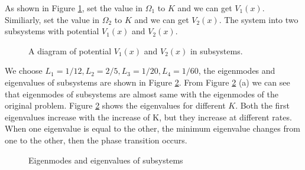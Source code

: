 \documentclass[12pt,a4paper]{article}
\begin{document}
As shown in Figure \ref{fig:11a}, set the value in $\Omega_1$ to $K$ and we can get $V_1(x)$. Similiarly, set the value in $\Omega_2$ to $K$ and we can get $V_2(x)$. The system into two subsystems with potential $V_1(x)$ and $V_2(x)$.
\begin{figure}[h]
\centering
{}
\caption{A diagram of potential $V_1(x)$ and $V_2(x)$ in subsystems.}
\label{fig:11a}
\end{figure}

We choose $L_1 = 1/12, L_2 = 2/5, L_3= 1/20, L_4 = 1/60$, the eigenmodes and eigenvalues of subsystems are shown in Figure \ref{fig:12d}. From Figure \ref{fig:12d} (a) we can see that eigenmodes of subsystems are almost same with the eigenmodes of the original problem. Figure \ref{fig:12d} shows the eigenvalues for different $K$. Both the first eigenvalues increase with the increase of K, but they increase at different rates. When one eigenvalue is equal to the other, the minimum eigenvalue changes from one to the other, then the phase transition occurs.
\begin{figure}[h]
\centering
{}
\caption{Eigenmodes and eigenvalues of subsystems}
\label{fig:12d}
\end{figure}
\end{document}
